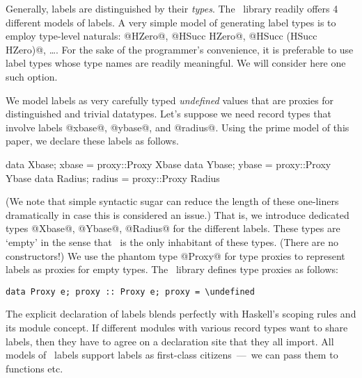 Generally, labels are distinguished by their \emph{types}. The \HList\
library readily offers 4 different models of labels. A very simple
model of generating label types is to employ type-level naturals:
@HZero@, @HSucc HZero@, @HSucc (HSucc HZero)@, \ldots.  For the sake
of the programmer's convenience, it is preferable to use label types
whose type names are readily meaningful. We will consider here one
such option.

We model labels as very carefully typed \emph{undefined} values that
are proxies for distinguished and trivial datatypes. Let's suppose we
need record types that involve labels @xbase@, @ybase@, and
@radius@. Using the prime model of this paper, we declare these labels
as follows.

\begin{code}
 data Xbase;  xbase  = proxy::Proxy Xbase
 data Ybase;  ybase  = proxy::Proxy Ybase
 data Radius; radius = proxy::Proxy Radius
\end{code}

\noindent
(We note that simple syntactic sugar can reduce the length of these
one-liners dramatically in case this is considered an issue.)  That
is, we introduce dedicated types @Xbase@, @Ybase@, @Radius@ for the
different labels. These types are `empty' in the sense that
\undefined\ is the only inhabitant of these types. (There are no
constructors!) We use the phantom type @Proxy@ for type proxies to
represent labels as proxies for empty types. The \HList\ library
defines type proxies as follows:

\begin{Verbatim}[fontsize=\small,commandchars=\\\{\}]
 data Proxy e; proxy :: Proxy e; proxy = \undefined
\end{Verbatim}

\noindent
The explicit declaration of labels blends perfectly with Haskell's
scoping rules and its module concept. If different modules with
various record types want to share labels, then they have to agree on
a declaration site that they all import. All models of \HList\ labels
support labels as first-class citizens~---~we can pass them to
functions etc.



